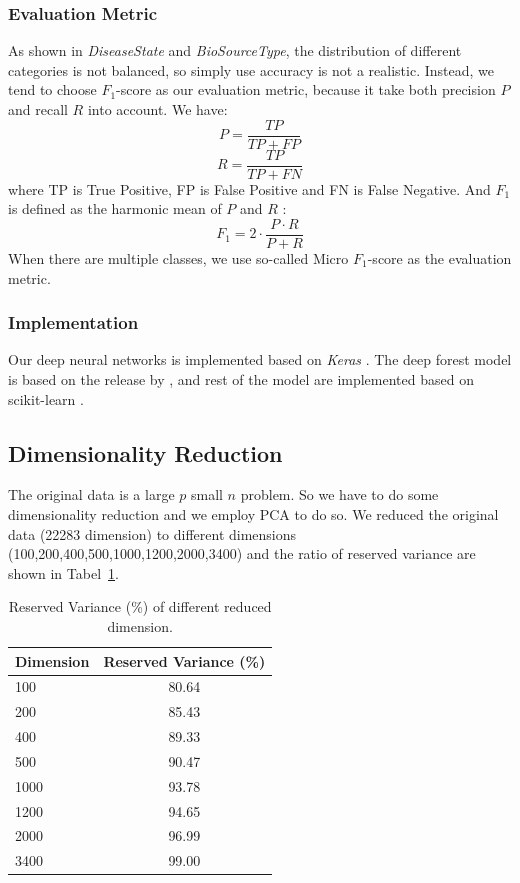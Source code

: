 \documentclass[sigconf]{acmart}
\begin{document}
	\subsubsection{Evaluation Metric}
	As shown in \textit{DiseaseState} and \textit{BioSourceType}, the distribution of different categories is not balanced, so simply use accuracy is not a realistic. Instead, we tend to choose $F_1$-score as our evaluation metric, because it take both precision $P$ and recall $R$ into account. We have:
	\begin{equation}
	P=\frac{TP}{TP+FP} \nonumber
	\end{equation}
	\begin{equation}
	R=\frac{TP}{TP+FN} \nonumber
	\end{equation}
	where TP is True Positive, FP is False Positive and FN is False Negative. And $F_1$ is defined as the harmonic mean of $P$ and
	$R$ : 
	\begin{equation}
	F_1=2\cdot\frac{P\cdot R}{P+R} \nonumber
	\end{equation}
	When there are multiple classes, we use so-called Micro $F_1$-score as the evaluation metric.
	
	\subsubsection{Implementation}
	Our deep neural networks is implemented based on \textit{Keras} \cite{chollet2015keras}. The deep forest model is based on the release by \citet{zhou2017deep}, and rest of the model are implemented based on scikit-learn \cite{scikit-learn}.
	
	\subsection{Dimensionality Reduction}
	The original data is a large $p$ small $n$ problem. So we have to do some dimensionality reduction and we employ PCA to do so. We reduced the original data (22283 dimension) to different dimensions (100,200,400,500,1000,1200,2000,3400) and the ratio of reserved variance are shown in Tabel~\ref{tab:PCA}.
	
	\begin{table}[tbp]
		\centering
		\begin{tabular}{l|c}
			\toprule
			Dimension & Reserved Variance (\%) \\
			\midrule
			100 & 80.64 \\
			200 & 85.43 \\
			400 & 89.33 \\
			500 & 90.47 \\
			1000 & 93.78 \\
			1200 & 94.65 \\
			2000 & 96.99 \\
			3400 & 99.00 \\			
			\bottomrule	
		\end{tabular}
		\caption{ Reserved Variance (\%) of different reduced dimension. }
		\label{tab:PCA}
	\end{table}
	
\end{document}
